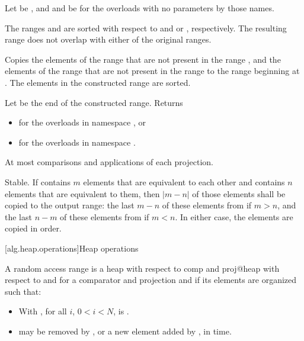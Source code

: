 \begin{itemdescr}
\pnum
Let  be ,
and  and  be 
for the overloads with no parameters by those names.

\pnum
\expects
The ranges  and  are sorted
with respect to  and  or , respectively.
The resulting range does not overlap with either of the original ranges.

\pnum
\effects
Copies the elements of the range 
that are not present in the range ,
and the elements of the range 
that are not present in the range 
to the range beginning at .
The elements in the constructed range are sorted.

\pnum
\returns
Let  be the end of the constructed range.
Returns
\begin{itemize}
\item
  for the overloads in namespace , or
\item
  for the overloads in namespace .
\end{itemize}

\pnum
\complexity
At most 
comparisons and applications of each projection.

\pnum
\remarks
Stable.
If  contains $m$ elements
that are equivalent to each other and
 contains $n$ elements
that are equivalent to them,
then $|m - n|$ of those elements shall be copied to the output range:
the last $m - n$ of these elements from  if $m > n$, and
the last $n - m$ of these elements from  if $m < n$.
In either case, the elements are copied in order.
\end{itemdescr}

[alg.heap.operations]{Heap operations}

\pnum
A random access range  is a
{heap with respect to comp and proj@heap with respect to  and }
for a comparator and projection  and 
if its elements are organized such that:

\begin{itemize}
\item
  With , for all $i$, $0 < i < N$,
  is .
\item
   may be removed by , or
  a new element added by ,
  in  time.
\end{itemize}


